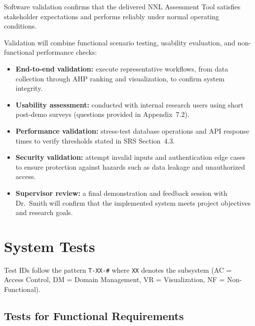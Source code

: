 \documentclass[12pt, titlepage]{article}
\begin{document}
Software validation confirms that the delivered NNL Assessment Tool satisfies
stakeholder expectations and performs reliably under normal operating
conditions.

Validation will combine functional scenario testing, usability evaluation, and
non-functional performance checks:

\begin{itemize}
  \item \textbf{End-to-end validation:} execute representative workflows, from
  data collection through AHP ranking and visualization, to confirm system
  integrity.

  \item \textbf{Usability assessment:} conducted with internal research users
  using short post-demo surveys (questions provided in Appendix~7.2).

  \item \textbf{Performance validation:} stress-test database operations and API
  response times to verify thresholds stated in SRS Section~4.3.

  \item \textbf{Security validation:} attempt invalid inputs and authentication
  edge cases to ensure protection against hazards such as data leakage and
  unauthorized access.

  \item \textbf{Supervisor review:} a final demonstration and feedback session
  with Dr.~Smith will confirm that the implemented system meets project
  objectives and research goals.
\end{itemize}

\section{System Tests}
\label{sec:system-tests}
Test IDs follow the pattern \texttt{T-XX-\#} where \texttt{XX} denotes the
subsystem (AC = Access Control, DM = Domain Management, VR = Visualization,
NF = Non-Functional).

\subsection{Tests for Functional Requirements}
\label{subsec:functional-tests}
\end{document}
